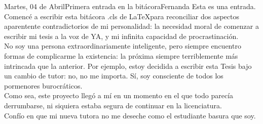 \documentclass{logbook}
\begin{document}
\makeCoverPage{}


\begin{entry}{Martes, 04 de Abril}{Primera entrada en la bitácora}{Fernanda}
Esta es una entrada. \\

Comencé a escribir esta bitácora .cls de \LaTeX para reconciliar dos aspectos aparentente contradictorios de mi personalidad: la necesidad moral de comenzar a escribir mi tesis a la voz de YA, y mi infinita capacidad de procrastinación. \\
No soy una persona extraordinariamente inteligente, pero siempre encuentro formas de complicarme la existencia: la próxima siempre terriblemente más intrincada que la anterior. Por ejemplo, estoy decidida a escribir esta Tesis bajo un cambio de tutor: no, no me importa. Sí, soy consciente de todos los pormenores burocráticos. \\ 

Como sea, este proyecto llegó a mí en un momento en el que todo parecía derrumbarse, ni siquiera estaba segura de continuar en la licenciatura. \\

Confío en que mi nueva tutora no me deseche como el estudiante basura que soy.

\end{entry}
\end{document}
